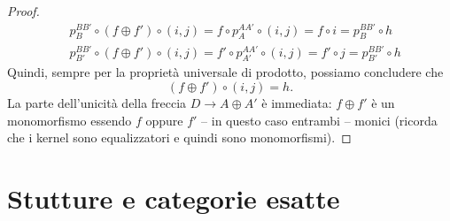 \begin{proof}
\begin{align*}
    & p_B^{BB'} \circ (f \oplus f') \circ (i,j) = f \circ p_A^{AA'} \circ (i,j) = f \circ i = p_B^{BB'} \circ h \\
    & p_{B'}^{BB'} \circ (f \oplus f') \circ (i,j) = f' \circ p_{A'}^{AA'} \circ (i,j) = f' \circ j = p_{B'}^{BB'} \circ h
  \end{align*}
  Quindi, sempre per la proprietà universale di prodotto, possiamo
  concludere che
  \[
    (f \oplus f') \circ (i,j) = h.
  \]
  La parte dell'unicità della freccia \(D \to A \oplus A'\) è immediata:
  \(f \oplus f'\) è un monomorfismo essendo \(f\) oppure \(f'\) -- in
  questo caso entrambi -- monici (ricorda che i kernel sono
  equalizzatori e quindi sono monomorfismi).
\end{proof}



\section{Stutture e categorie esatte}

